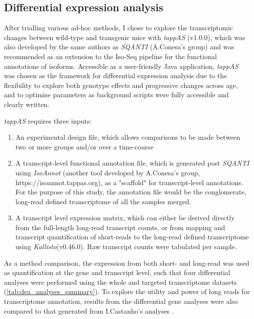 \subsection{Differential expression analysis}
After trialling various ad-hoc methods, I chose to explore the transcriptomic changes between wild-type and transgenic mice with \textit{tappAS} (v1.0.0)\cite{DeLaFuente2020}, which was also developed by the same authors as \textit{SQANTI} (A.Conesa's group) and was recommended as an extension to the Iso-Seq pipeline for the functional annotations of isoforms. Accessible as a user-friendly Java application, \textit{tappAS} was chosen as the framework for differential expression analysis due to the flexibility to explore both genotype effects and progressive changes across age, and to optimise parameters as background scripts were fully accessible and clearly written.

\textit{tappAS} requires three inputs\cite{DeLaFuente2020}:
\begin{enumerate}
	\item An experimental design file, which allows comparisons to be made between two or more groups and/or over a time-course 
	\item A transcript-level functional annotation file, which is generated post \textit{SQANTI} using \textit{IsoAnnot} (another tool developed by A.Conesa's group, https://isoannot.tappas.org), as a "scaffold" for transcript-level annotations. For the purpose of this study, the annotation file would be the conglomerate, long-read defined transcriptome of all the samples merged. 
	\item A transcript level expression matrix, which can either be derived directly from the full-length long-read transcript counts, or from mapping and transcript quantification of short-reads to the long-read defined transcriptome using \textit{Kallisto}(v0.46.0). Raw transcript counts were tabulated per sample.  	 
\end{enumerate}

As a method comparison, the expression from both short- and long-read was used as quantification at the gene and transcript level, such that four differential analyses were performed using the whole and targeted transcriptome datasets (\cref{tab:dea_analyses_summary}). To explore the utility and power of long reads for transcriptome annotation, results from the differential gene analyses were also compared to that generated from I.Castanho's analyses \cite{Castanho2020}. 

